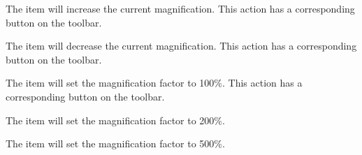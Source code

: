 
The  item will increase the current
magnification. This action has a corresponding
button on the toolbar.


The  item will decrease the current
magnification. This action has a corresponding
button on the toolbar.


The  item will set the magnification factor to
100\%. This action has a corresponding
button on the toolbar.


The  item will set the magnification factor to
200\%.


The  item will set the magnification factor to
500\%.

